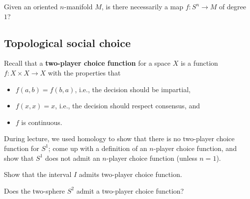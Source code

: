 \documentclass[12pt]{pset}
\begin{document}
\begin{problem}
  Given an oriented $n$-manifold $M$, is there necessarily a map $f : S^n \to M$ of degree $1$?
\end{problem}

\subsection*{Topological social choice}

Recall that a \textbf{two-player choice function} for a space $X$ is a function $f : X \times X \to X$ with the properties that
\begin{itemize}
\item $f(a,b) = f(b,a)$, i.e., the decision should be impartial,
\item $f(x,x) = x$, i.e., the decision should respect consensus, and
\item $f$ is continuous.
\end{itemize}
\begin{problem}
  During lecture, we used homology to show that there is no two-player choice function for $S^1$; come up with a definition of an $n$-player choice function, and show that $S^1$ does not admit an $n$-player choice function (unless $n = 1$).
\end{problem}

\begin{requiredproblem}
  Show that the interval $I$ admits two-player choice function.
\end{requiredproblem}

\begin{problem}
  Does the two-sphere $S^2$ admit a two-player choice function?
\end{problem}
\end{document}
